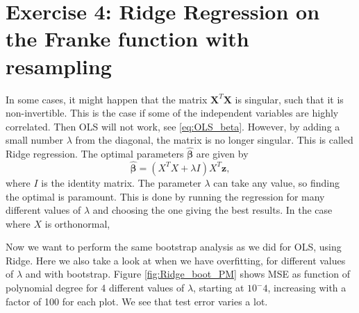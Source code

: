 \documentclass[reprint,english,notitlepage,aps,nobalancelastpage,nofootinbib]{revtex4-1}  %
\newcommand{\vc}[1]{\mathbf{#1}}
\begin{document}
\section*{Exercise 4: Ridge Regression on the Franke function with resampling}
In some cases, it might happen that the matrix $\mathbf{X}^T\mathbf{X}$ is singular, such that it is non-invertible. This is the case if some of the independent variables are highly correlated. Then OLS will not work, see \eqref{eq:OLS_beta}. However, by adding a small number $\lambda$ from the diagonal, the matrix is no longer singular. This is called Ridge regression. The optimal parameters $\boldsymbol{\hat\beta}$ are given by
\begin{equation}
	\boldsymbol{\hat{\beta}} = (X^TX+\lambda I)X^T\vc{z},
\end{equation}
where $I$ is  the identity matrix. The parameter $\lambda$ can take any value, so finding the optimal is paramount. This is done by running the regression for many different values of $\lambda$ and choosing the one giving the best results. In the case where $X$ is orthonormal,

Now we want to perform the same bootstrap analysis as we did for OLS, using Ridge. Here we also take a look at when we have overfitting, for different values of $\lambda$ and with bootstrap. Figure \ref{fig:Ridge_boot_PM} shows MSE as function of polynomial degree for 4 different values of $\lambda$, starting at $10^-4$, increasing with a factor of 100 for each plot. We see that test error varies a lot.
\end{document}
